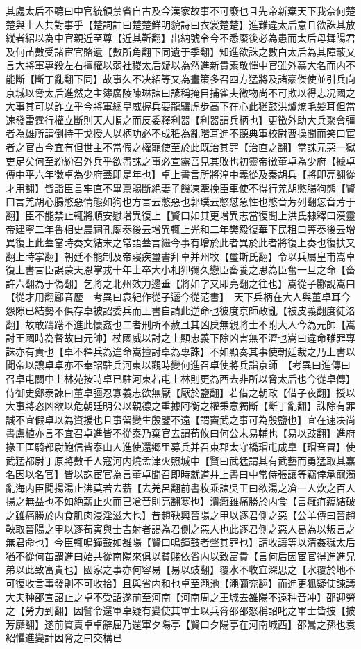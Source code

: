 其處太后不聽曰中官統領禁省自古及今漢家故事不可廢也且先帝新棄天下我奈何楚楚與士人共對事乎【楚詞註曰楚楚鮮明貌詩曰衣裳楚楚】進難違太后意且欲誅其放縱者紹以為中官親近至尊【近其靳翻】出納號令今不悉廢後必為患而太后母舞陽君及何苖數受諸宦官賂遺【數所角翻下同遺于季翻】知進欲誅之數白太后為其障蔽又言大將軍專殺左右擅權以弱社稷太后疑以為然進新貴素敬憚中官雖外慕大名而内不能斷【斷丁亂翻下同】故事久不决紹等又為畫策多召四方猛將及諸豪傑使並引兵向京城以脅太后進然之主簿廣陵陳琳諫曰諺稱掩目捕雀夫微物尚不可欺以得志况國之大事其可以詐立乎今將軍總皇威握兵要龍驤虎步高下在心此猶鼓洪爐燎毛髪耳但當速發雷霆行權立斷則天人順之而反委釋利器【利器謂兵柄也】更徵外助大兵聚會彊者為雄所謂倒持干戈授人以柄功必不成秖為亂階耳進不聽典軍校尉曹操聞而笑曰宦者之官古今宜有但世主不當假之權寵使至於此既治其罪【治直之翻】當誅元惡一獄吏足矣何至紛紛召外兵乎欲盡誅之事必宣露吾見其敗也初靈帝徵董卓為少府【據卓傳中平六年徵卓為少府蓋即是年也】卓上書言所將湟中義從及秦胡兵【將即亮翻從才用翻】皆詣臣言牢直不畢禀賜斷絶妻子饑凍牽挽臣車使不得行羌胡憋腸狗態【賢曰言羌胡心腸憋惡情態如狗也方言云憋惡也郭璞云憋怤急性也憋音芳列翻怤音芳于翻】臣不能禁止輒將順安慰增異復上【賢曰如其更增異志當復聞上洪氏隸釋曰漢靈帝建寧二年魯相史晨祠孔廟奏後云增異輒上光和二年樊毅復華下民租口筭奏後云增異復上此蓋當時奏文結末之常語蓋言繼今事有增於此者異於此者將復上奏也復扶又翻上時掌翻】朝廷不能制及帝寢疾璽書拜卓并州牧【璽斯氏翻】令以兵屬皇甫嵩卓復上書言臣誤蒙天恩掌戎十年士卒大小相狎彌久戀臣畜養之思為臣奮一旦之命【畜許六翻為于偽翻】乞將之北州效力邊垂【將如字又即亮翻之往也】嵩從子酈說嵩曰【從才用翻酈音歷　考異曰袁紀作從子邐今從范書】　天下兵柄在大人與董卓耳今怨隙已結勢不俱存卓被詔委兵而上書自請此逆命也彼度京師政亂【被皮義翻度徒洛翻】故敢躊躇不進此懷姦也二者刑所不赦且其凶戾無親將士不附大人今為元帥【嵩討王國時為督故曰元帥】杖國威以討之上顯忠義下除凶害無不濟也嵩曰違命雖罪專誅亦有責也【卓不釋兵為違命嵩擅討卓為專誅】不如顯奏其事使朝廷裁之乃上書以聞帝以讓卓卓亦不奉詔駐兵河東以觀時變何進召卓使將兵詣京師　【考異曰進傳曰召卓屯關中上林苑按時卓已駐河東若屯上林則更為西去非所以脅太后也今從卓傳】侍御史鄭泰諫曰董卓彊忍寡義志欲無厭【厭於鹽翻】若借之朝政【借子夜翻】授以大事將恣凶欲以危朝廷明公以親德之重據阿衡之權秉意獨斷【斷丁亂翻】誅除有罪誠不宜假卓以為資援也且事留變生殷鑒不遠【謂竇武之事可為殷鹽也】宜在速决尚書盧植亦言不宜召卓進皆不從泰乃棄官去謂荀攸曰何公未易輔也【易以豉翻】進府掾王匡騎都尉鮑信皆泰山人進使還郷里募兵并召東郡太守橋瑁屯成臯【瑁音冒】使武猛都尉丁原將數千人寇河内燒孟津火照城中【賢曰武猛謂其有武藝而勇猛取其嘉名因以名官】皆以誅宦官為言董卓聞召即時就道并上書曰中常侍張讓等竊倖承寵濁亂海内臣聞揚湯止沸莫若去薪【去羌呂翻前書枚乘諫吳王曰欲湯之凔一人炊之百人揚之無益也不如絶薪止火而已凔音則亮翻寒也】潰癰雖痛勝於内食【言癰疽藴結破之雖痛勝於内食肌肉浸淫滋大也】昔趙鞅興晉陽之甲以逐君側之惡【公羊傳曰晉趙鞅取晉陽之甲以逐荀寅與士吉射者謁為君側之惡人也此逐君側之惡人曷為以叛言之無君命也】今臣輒鳴鐘鼓如雒陽【賢曰鳴鐘鼓者聲其罪也】請收讓等以清姦穢太后猶不從何苖謂進曰始共從南陽來俱以貧賤依省内以致富貴【言何后因宦官得進進兄弟以此致富貴也】國家之事亦何容易【易以豉翻】覆水不收宜深思之【水覆於地不可復收言事發則不可收拾】且與省内和也卓至澠池【澠彌兖翻】而進更狐疑使諫議大夫种邵宣詔止之卓不受詔遂前至河南【河南周之王城去雒陽不遠种音冲】邵迎勞之【勞力到翻】因譬令還軍卓疑有變使其軍士以兵脅邵邵怒稱詔叱之軍士皆披【披芳靡翻】遂前質責卓卓辭屈乃還軍夕陽亭【賢曰夕陽亭在河南城西】邵暠之孫也袁紹懼進變計因脅之曰交構已